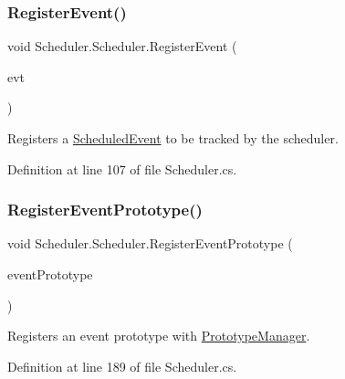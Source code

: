 \subsubsection{\texorpdfstring{Register\+Event()}{RegisterEvent()}}
{\footnotesize\ttfamily void Scheduler.\+Scheduler.\+Register\+Event (\begin{DoxyParamCaption}\item[{\hyperlink{class_scheduler_1_1_scheduled_event}{Scheduled\+Event}}]{evt }\end{DoxyParamCaption})}



Registers a \hyperlink{class_scheduler_1_1_scheduled_event}{Scheduled\+Event} to be tracked by the scheduler. 



Definition at line 107 of file Scheduler.\+cs.

\mbox{\label{class_scheduler_1_1_scheduler_aed037bf3f01540e9f8fcf7c4a0f61573}} 
\subsubsection{\texorpdfstring{Register\+Event\+Prototype()}{RegisterEventPrototype()}}
{\footnotesize\ttfamily void Scheduler.\+Scheduler.\+Register\+Event\+Prototype (\begin{DoxyParamCaption}\item[{\hyperlink{class_scheduler_1_1_scheduled_event}{Scheduled\+Event}}]{event\+Prototype }\end{DoxyParamCaption})}



Registers an event prototype with \hyperlink{class_prototype_manager}{Prototype\+Manager}. 



Definition at line 189 of file Scheduler.\+cs.

\mbox{\label{class_scheduler_1_1_scheduler_a198612b5b2266eab1ac6b80a65f788eb}} 
